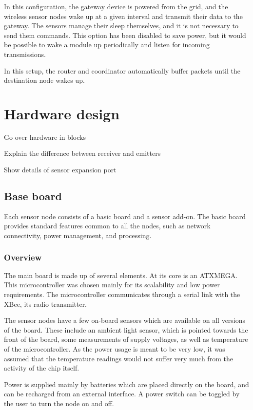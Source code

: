 In this configuration, the gateway device is powered from the grid, and the
wireless sensor nodes wake up at a given interval and transmit their data to the
gateway. The sensors manage their sleep themselves, and it is not necessary to
send them commands. This option has been disabled to save power, but it would be
possible to wake a module up periodically and listen for incoming transmissions.

In this setup, the router and coordinator automatically buffer packets until the
destination node wakes up.

\section{Hardware design}

Go over hardware in blocks

Explain the difference between receiver and emitters

Show details of sensor expansion port

\subsection{Base board}

Each sensor node consists of a basic board and a sensor add-on. The basic board
provides standard features common to all the nodes, such as network
connectivity, power management, and processing.

\subsubsection{Overview}

The main board is made up of several elements. At its core is an ATXMEGA. This
microcontroller was chosen mainly for its scalability and low power
requirements. The microcontroller communicates through a serial link with the
XBee, its radio transmitter.

The sensor nodes have a few on-board sensors which are available on all versions
of the board. These include an ambient light sensor, which is pointed towards
the front of the board, some measurements of supply voltages, as well as
temperature of the microcontroller. As the power usage is meant to be very low,
it was assumed that the temperature readings would not suffer very much from
the activity of the chip itself.

Power is supplied mainly by batteries which are placed directly on the board,
and can be recharged from an external interface. A power switch can be toggled
by the user to turn the node on and off.

